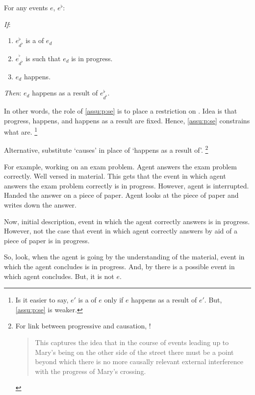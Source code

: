 \begin{note}
  \begin{assumption}[\se{3}]
    \label{assu:p:se}
    For any events \(e\), \(e^{\flat}\):
    \begin{itenum}
    \item[\emph{If}:]
      \begin{enumerate}
      \item
        \(e^{\flat}_{d^{\flat}}\) is a \emph{} of \(e_{d}\)
      \item
        \(e^{^{\flat}}_{d^{\flat}}\) is such that \(e_{d}\) is in progress.
      \item
        \(e_{d}\) happens.
      \end{enumerate}
    \item[\emph{Then}:]
      \(e_{d}\) happens as a result of \(e^{\flat}_{d^{\flat}}\).
    \end{itenum}
  \end{assumption}

  \noindent%
  In other words, the role of \autoref{assu:p:se} is to place a restriction on .
  Idea is that progress, happens, and happens as a result are fixed.
  Hence, \autoref{assu:p:se} constrains what  are.%
  \footnote{
    Is it easier to say, \(e'\) is a  of \(e\) only if \(e\) happens as a result of \(e'\).
    But, \autoref{assu:p:se} is weaker.
  }

  Alternative, substitute `causes' in place of `happens as a result of'.%
  \footnote{
    For link between progressive and causation, \textcite{Szabo:2004ul}!

    \begin{quote}
    This captures the idea that in the course of events leading up to Mary’s being on the other side of the street there must be a point beyond which there is no more causally relevant external interference with the progress of Mary’s crossing.
  \end{quote}
  }
\end{note}


\begin{note}
  For example, working on an exam problem.
  Agent answers the exam problem correctly.
  Well versed in material.
  This gets that the event in which agent answers the exam problem correctly is in progress.
  However, agent is interrupted.
  Handed the answer on a piece of paper.
  Agent looks at the piece of paper and writes down the answer.

  Now, initial description, event in which the agent correctly answers is in progress.
  However, not the case that event in which agent correctly answers by aid of a piece of paper is in progress.

  So, look, when the agent is going by the understanding of the material, event in which the agent concludes is in progress.
  And, by \assuPP{} there is a possible event in which agent concludes.
  But, it is not \(e\).
\end{note}



